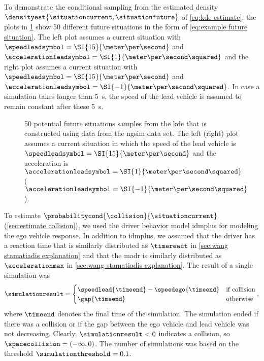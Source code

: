 To demonstrate the conditional sampling from the estimated density $\densityest{\situationcurrent,\situationfuture}$ of \cref{eq:kde estimate}, the plots in \cref{fig:speed profiles} show 50 different future situations in the form of \cref{eq:example future situation}.
The left plot assumes a current situation with $\speedleadsymbol=\SI{15}{\meter\per\second}$ and $\accelerationleadsymbol=\SI{1}{\meter\per\second\squared}$ and the right plot assumes a current situation with $\speedleadsymbol=\SI{15}{\meter\per\second}$ and $\accelerationleadsymbol=\SI{-1}{\meter\per\second\squared}$.
In case a simulation takes longer than \SI{5}{\second}, the speed of the lead vehicle is assumed to remain constant after these \SI{5}{\second}.

\setlength{\figurewidth}{.49\linewidth}
\setlength{\figureheight}{.7\figurewidth}
\begin{figure}
	\centering
	
	
	\caption{50 potential future situations samples from the \ac{kde} that is constructed using data from the \ac{ngsim} data set. 
		The left (right) plot assumes a current situation in which the speed of the lead vehicle is $\speedleadsymbol=\SI{15}{\meter\per\second}$ and the acceleration is $\accelerationleadsymbol=\SI{1}{\meter\per\second\squared}$ ($\accelerationleadsymbol=\SI{-1}{\meter\per\second\squared}$).}
	\label{fig:speed profiles}
\end{figure}

To estimate $\probabilitycond{\collision}{\situationcurrent}$ (\cref{sec:estimate collision}), we used the driver behavior model \ac{idmplus} \autocite{schakel2010effects} for modeling the ego vehicle response.
In addition to \ac{idmplus}, we assumed that the driver has a reaction time that is similarly distributed as $\timereact$ in \cref{sec:wang stamatiadis explanation} and that the \ac{madr} is similarly distributed as $\accelerationmax$ in \cref{sec:wang stamatiadis explanation}.
The result of a single simulation was
\begin{equation}
	\simulationresult = \begin{cases}
		\speedlead{\timeend} - \speedego{\timeend} & \text{if collision} \\
		\gap{\timeend} & \text{otherwise}
	\end{cases},
\end{equation}
where $\timeend$ denotes the final time of the simulation.
The simulation ended if there was a collision or if the gap between the ego vehicle and lead vehicle was not decreasing.
Clearly, $\simulationresult<0$ indicates a collision, so $\spacecollision=(-\infty, 0)$.
The number of simulations was based on the threshold $\simulationthreshold=0.1$.

